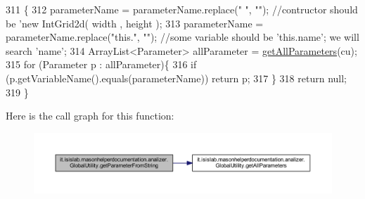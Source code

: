\begin{DoxyCode}
311                                                                                             \{
312         parameterName = parameterName.replace(\textcolor{stringliteral}{" "}, \textcolor{stringliteral}{""}); \textcolor{comment}{//contructor should be 'new IntGrid2d( width  ,
       height  );}
313         parameterName = parameterName.replace(\textcolor{stringliteral}{"this."}, \textcolor{stringliteral}{""}); \textcolor{comment}{//some variable should be 'this.name'; we will
       search 'name';}
314         ArrayList<Parameter> allParameter = \hyperlink{classit_1_1isislab_1_1masonhelperdocumentation_1_1analizer_1_1_global_utility_a7bfa58de5b5e760b043e34e98aa222ee}{getAllParameters}(cu);
315         \textcolor{keywordflow}{for} (Parameter p : allParameter)\{
316             \textcolor{keywordflow}{if} (p.getVariableName().equals(parameterName))  \textcolor{keywordflow}{return} p;
317         \}       
318         \textcolor{keywordflow}{return} null;
319     \}
\end{DoxyCode}


Here is the call graph for this function\-:
\nopagebreak
\begin{figure}[H]
\begin{center}
\leavevmode
\includegraphics[width=350pt]{classit_1_1isislab_1_1masonhelperdocumentation_1_1analizer_1_1_global_utility_ad7c0b1c480e30f055bb39d24c68902e7_cgraph}
\end{center}
\end{figure}


